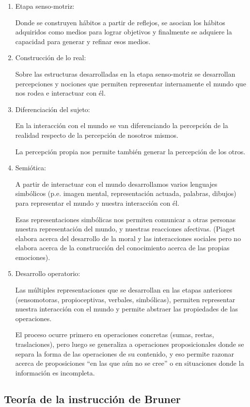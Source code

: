 \documentclass[
  12,
]{scrartcl}
\begin{document}
\begin{enumerate}
\def\labelenumi{\arabic{enumi}.}
\item
  Etapa senso-motriz:

  Donde se construyen hábitos a partir de reflejos, se asocian los
  hábitos adquiridos como medios para lograr objetivos y finalmente se
  adquiere la capacidad para generar y refinar esos medios.
\item
  Construcción de lo real:

  Sobre las estructuras desarrolladas en la etapa senso-motriz se
  desarrollan percepciones y nociones que permiten representar
  internamente el mundo que nos rodea e interactuar con él.
\item
  Diferenciación del sujeto:

  En la interacción con el mundo se van diferenciando la percepción de
  la realidad respecto de la percepción de nosotros mismos.

  La percepción propia nos permite también generar la percepción de los
  otros.
\item
  Semiótica:

  A partir de interactuar con el mundo desarrollamos varios lenguajes
  simbólicos (p.e. imagen mental, representación actuada, palabras,
  dibujos) para representar el mundo y nuestra interacción con él.

  Esas representaciones simbólicas nos permiten comunicar a otras
  personas nuestra representación del mundo, y nuestras reacciones
  afectivas. (Piaget elabora acerca del desarrollo de la moral y las
  interacciones sociales pero no elabora acerca de la construcción del
  conocimiento acerca de las propias emociones).
\item
  Desarrollo operatorio:

  Las múltiples representaciones que se desarrollan en las etapas
  anteriores (sensomotoras, propioceptivas, verbales, simbólicas),
  permiten representar nuestra interacción con el mundo y permite
  abstraer las propiedades de las operaciones.

  El proceso ocurre primero en operaciones concretas (sumas, restas,
  traslaciones), pero luego se generaliza a operaciones proposicionales
  donde se separa la forma de las operaciones de su contenido, y eso
  permite razonar acerca de proposiciones ``en las que aún no se cree''
  o en situaciones donde la información es incompleta.
\end{enumerate}

\hypertarget{teoruxeda-de-la-instrucciuxf3n-de-bruner}{%
\subsection{Teoría de la instrucción de
Bruner}\label{teoruxeda-de-la-instrucciuxf3n-de-bruner}}
\end{document}
